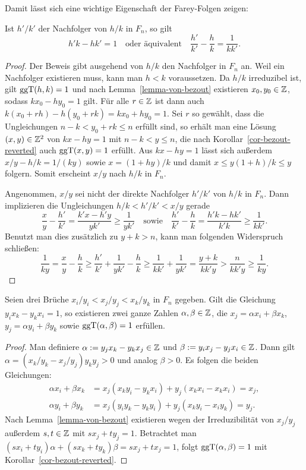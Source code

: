 Damit lässt sich eine wichtige Eigenschaft der Farey-Folgen zeigen:
\begin{lemma}\label{lemma-basic-property-farey-successor}
	Ist $h'/k'$ der Nachfolger von $h/k$ in $F_n$, so gilt \[
	h'k - hk' = 1 \text{~~~oder äquivalent~~~} \frac{h'}{k'} - \frac{h}{k} = \frac{1}{kk'}.
	\]
\end{lemma}
\begin{proof}
	Der Beweis gibt ausgehend von $h/k$ den Nachfolger in $F_n$ an.
	Weil ein Nachfolger existieren muss, kann man $h<k$ voraussetzen.
	Da $h/k$ irreduzibel ist, gilt $\operatorname{ggT}(h,k)= 1$ und nach Lemma~\ref{lemma-von-bezout} existieren $x_0, y_0\in\mathbb{Z}$, sodass $kx_0 -hy_0 = 1$ gilt.
	Für alle $r\in\mathbb{Z}$ ist dann auch $k(x_0 + rh) - h(y_0 + rk) = k x_0 + hy_0 = 1$.
	Sei $r$ so gewählt, dass die Ungleichungen $n-k<y_0 +rk \leq n$ erfüllt sind, so erhält man eine Lösung $(x,y)\in\mathbb{Z}^2$ von $kx - hy = 1$ mit $n-k<y\leq n$, die nach Korollar~\ref{cor-bezout-reverted} auch $\operatorname{ggT}(x,y)=1$ erfüllt.
	Aus $kx-hy=1$ lässt sich außerdem $x/y - h/k = 1/(ky)$ sowie $x = (1+hy)/k$ und damit $x \leq y(1+h)/k \leq y$ folgern.
	Somit erscheint $x/y$ nach $h/k$ in $F_n$.
	
	Angenommen, $x/y$ sei nicht der direkte Nachfolger $h'/k'$ von $h/k$ in $F_n$.
	Dann implizieren die Ungleichungen $h/k < h'/k' < x/y$ gerade \[
	\frac{x}{y} - \frac{h'}{k'} = \frac{k'x-h'y}{yk'} \geq \frac{1}{yk'}\text{~~~sowie~~~} \frac{h'}{k'} - \frac{h}{k} = \frac{h'k - hk'}{k'k} \geq  \frac{1}{kk'}. \]
	Benutzt man dies zusätzlich zu $y+k > n$, kann man folgenden Widerspruch schließen:
	\[
		\frac{1}{ky} = \frac{x}{y} - \frac{h}{k} \geq \frac{h'}{k'} + \frac{1}{yk'}- \frac{h}{k} \geq \frac{1}{kk'} + \frac{1}{yk'} = \frac{y+k}{kk'y} > \frac{n}{kk'y} \geq \frac{1}{ky}.
	\]
\end{proof}

\begin{lemma}\label{lemma-farey-middle-member}
	Seien drei Brüche $x_i/y_i < x_j / y_j < x_k / y_k$ in $F_n$ gegeben.
	Gilt die Gleichung $y_i x_k - y_k x_i = 1$, so existieren zwei ganze Zahlen $\alpha,\beta\in\mathbb{Z}$, die $x_j = \alpha x_i + \beta x_k$, $y_j = \alpha y_i + \beta y_k$ sowie $\operatorname{ggT}(\alpha, \beta)=1$ erfüllen.
\end{lemma}
\begin{proof}
	Man definiere $\alpha:= y_j x_k - y_k x_j\in\mathbb{Z}$ und $\beta:=y_i x_j - y_j x_i\in\mathbb{Z}$.
	Dann gilt  $\alpha = (x_k/y_k - x_j/y_j)y_k y_j > 0$ und analog $\beta > 0$.
	Es folgen die beiden Gleichungen:
	\begin{align*}
	\alpha x_i + \beta x_k &= x_j(x_k y_i - y_k x_i ) + y_j (x_k x_i - x_k x_i) = x_j, \\[1em]
	\alpha y_i + \beta y_k &= x_j (y_i y_k - y_k y_i) + y_j (x_k y_i - x_i y_k) = y_j.
	\end{align*}
	Nach Lemma~\ref{lemma-von-bezout} existieren wegen der Irreduzibilität von $x_j/y_j$ außerdem $s,t\in\mathbb{Z}$ mit $sx_j + ty_j = 1$.
	Betrachtet man $(sx_i + ty_i)\alpha + (sx_k + ty_k)\beta = s x_j + t x_j = 1$, folgt $\operatorname{ggT}(\alpha, \beta) = 1$ mit Korollar~\ref{cor-bezout-reverted}.
\end{proof}

